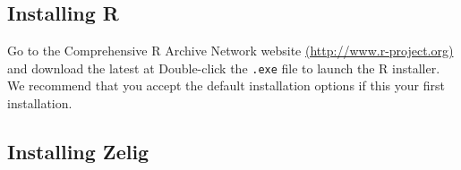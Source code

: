 \documentclass{article}
\begin{document}
\subsection{Installing R}

Go to the Comprehensive R Archive Network website
\url{(http://www.r-project.org)} and download the latest
 at
Double-click the {\tt .exe} file to launch the R installer.  We recommend
that you accept the default installation options if this your first
installation.

\subsection{Installing Zelig}
\end{document}
